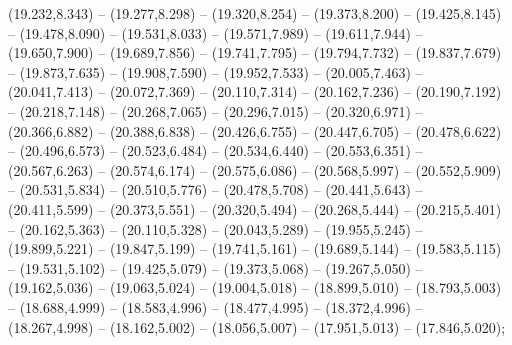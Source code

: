 (19.232,8.343) -- (19.277,8.298) -- (19.320,8.254) -- (19.373,8.200) -- (19.425,8.145) -- (19.478,8.090) -- (19.531,8.033) -- (19.571,7.989) -- (19.611,7.944) -- (19.650,7.900) -- (19.689,7.856) -- (19.741,7.795) -- (19.794,7.732) -- (19.837,7.679) -- (19.873,7.635) -- (19.908,7.590) -- (19.952,7.533) -- (20.005,7.463) -- (20.041,7.413) -- (20.072,7.369) -- (20.110,7.314) -- (20.162,7.236) -- (20.190,7.192) -- (20.218,7.148) -- (20.268,7.065) -- (20.296,7.015) -- (20.320,6.971) -- (20.366,6.882) -- (20.388,6.838) -- (20.426,6.755) -- (20.447,6.705) -- (20.478,6.622) -- (20.496,6.573) -- (20.523,6.484) -- (20.534,6.440) -- (20.553,6.351) -- (20.567,6.263) -- (20.574,6.174) -- (20.575,6.086) -- (20.568,5.997) -- (20.552,5.909) -- (20.531,5.834) -- (20.510,5.776) -- (20.478,5.708) -- (20.441,5.643) -- (20.411,5.599) -- (20.373,5.551) -- (20.320,5.494) -- (20.268,5.444) -- (20.215,5.401) -- (20.162,5.363) -- (20.110,5.328) -- (20.043,5.289) -- (19.955,5.245) -- (19.899,5.221) -- (19.847,5.199) -- (19.741,5.161) -- (19.689,5.144) -- (19.583,5.115) -- (19.531,5.102) -- (19.425,5.079) -- (19.373,5.068) -- (19.267,5.050) -- (19.162,5.036) -- (19.063,5.024) -- (19.004,5.018) -- (18.899,5.010) -- (18.793,5.003) -- (18.688,4.999) -- (18.583,4.996) -- (18.477,4.995) -- (18.372,4.996) -- (18.267,4.998) -- (18.162,5.002) -- (18.056,5.007) -- (17.951,5.013) -- (17.846,5.020);
